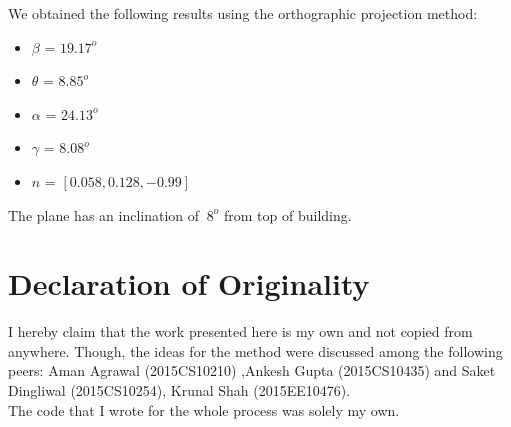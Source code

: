 \documentclass[paper=a4, fontsize=11pt]{scrartcl} %
\begin{document}
We obtained the following results using the orthographic projection method:
\begin{itemize}
    \item $\beta$ = $19.17^o$
    \item $\theta$ = $8.85^o$
    \item $\alpha$ = $24.13^o$
    \item $\gamma$ = $8.08^o$
    \item $n$ = $[0.058, 0.128, -0.99]$
\end{itemize}
The plane has an inclination of $~8^o$ from top of building.

\section*{Declaration of Originality}
I hereby claim that the work presented here is my own and not copied from anywhere. Though, the ideas for the method
were discussed among the following peers: Aman Agrawal (2015CS10210) ,Ankesh Gupta (2015CS10435) and
Saket Dingliwal (2015CS10254), Krunal Shah (2015EE10476).\\
The code that I wrote for the whole process was solely my own.
\end{document}

